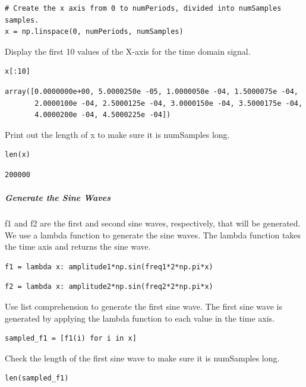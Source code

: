 \begin{verbatim}
# Create the x axis from 0 to numPeriods, divided into numSamples samples.
x = np.linspace(0, numPeriods, numSamples)
\end{verbatim}

Display the first 10 values of the X-axis for the time domain signal.

\begin{verbatim}
x[:10]
\end{verbatim}

\begin{verbatim}
array([0.0000000e+00, 5.0000250e -05, 1.0000050e -04, 1.5000075e -04,
       2.0000100e -04, 2.5000125e -04, 3.0000150e -04, 3.5000175e -04,
       4.0000200e -04, 4.5000225e -04])
\end{verbatim}

Print out the length of x to make sure it is numSamples long.

\begin{verbatim}
len(x)
\end{verbatim}

\begin{verbatim}
200000
\end{verbatim}

\subparagraph{Generate the Sine Waves}

f1 and f2 are the first and second sine waves, respectively, that will be generated.  We use a lambda function to generate the sine waves.  The lambda function takes the time axis and returns the sine wave.

\begin{verbatim}
f1 = lambda x: amplitude1*np.sin(freq1*2*np.pi*x)
\end{verbatim}

\begin{verbatim}
f2 = lambda x: amplitude2*np.sin(freq2*2*np.pi*x)
\end{verbatim}

Use list comprehension to generate the first sine wave.  The first sine wave is generated by applying the lambda function to each value in the time axis.

\begin{verbatim}
sampled_f1 = [f1(i) for i in x]
\end{verbatim}

Check the length of the first sine wave to make sure it is numSamples long.

\begin{verbatim}
len(sampled_f1)
\end{verbatim}

